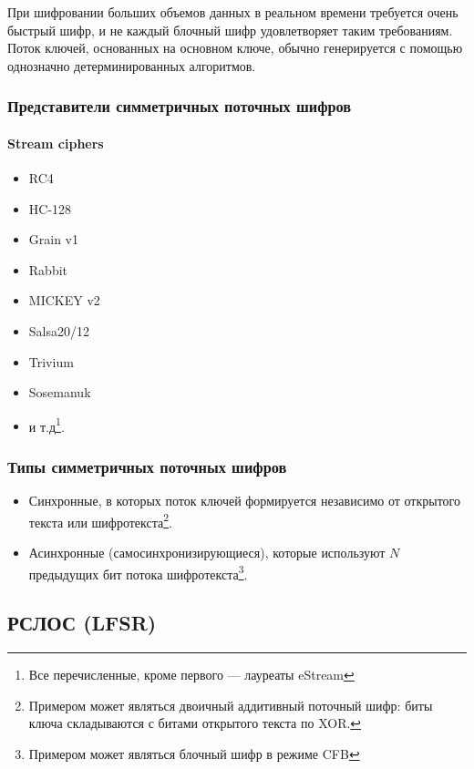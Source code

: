 При шифровании больших объемов данных в реальном времени требуется очень быстрый шифр, и не каждый блочный шифр удовлетворяет таким требованиям. Поток ключей, основанных на основном ключе, обычно генерируется с помощью однозначно детерминированных алгоритмов.

\begin{frame}
    \frametitle{Представители симметричных поточных шифров}
    \framesubtitle{Stream ciphers}
    
    \begin{itemize}
        \item RC4
        \item HC-128 
        \item Grain v1
        \item Rabbit 
        \item MICKEY v2
        \item Salsa20/12 
        \item Trivium
        \item Sosemanuk
        \item и т.д\footnote{Все перечисленные, кроме первого --- лауреаты eStream}.
    \end{itemize} 
\end{frame}


\begin{frame}
    \frametitle{Типы симметричных поточных шифров}
    
    \begin{itemize}
        \item \alert{Синхронные}, в которых поток ключей формируется независимо от открытого текста или шифротекста\footnote{Примером может являться \alert{двоичный аддитивный поточный шифр}: биты ключа складываются с битами открытого текста по XOR.}.
        \item \alert{Асинхронные} (самосинхронизирующиеся), которые используют $N$ предыдущих бит потока шифротекста\footnote{Примером может являться \alert{блочный} шифр в режиме CFB}. 
    \end{itemize} 
\end{frame}


\subsection{РСЛОС (LFSR)}


